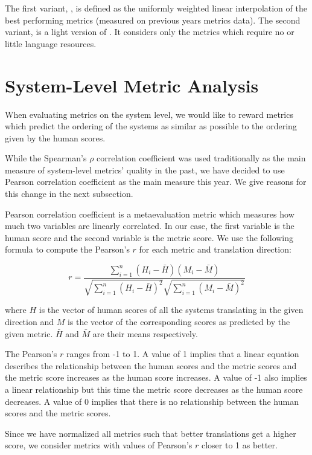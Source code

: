 The first variant, , is defined as the uniformly weighted
linear interpolation of the best performing metrics (measured on previous years
metrics data). The second variant,  is a light version of
.  It considers only the metrics which require no or little
language resources.


\section{System-Level Metric Analysis}
\label{system-level}

When evaluating metrics on the system level, we would like to reward metrics
which predict the ordering of the systems as similar as possible to the
ordering given by the human scores.

While the Spearman's $\rho$ correlation coefficient was used traditionally as
the main measure of system-level metrics' quality in the past, we have decided
to use Pearson correlation coefficient as the main measure this year. We give
reasons for this change in the next subsection.

Pearson correlation coefficient is a metaevaluation metric which measures how
much two variables are linearly correlated.  In our case, the first variable is
the human score and the second variable is the metric score. We use the
following formula to compute the Pearson's $r$ for each metric and translation
direction:

\begin{equation}
    r = \frac{\sum ^n _{i=1}(H_i - \bar{H})(M_i - \bar{M})}{\sqrt{\sum ^n _{i=1}(H_i - \bar{H})^2} \sqrt{\sum ^n _{i=1}(M_i - \bar{M})^2}} 
\end{equation}

\noindent where $H$ is the vector of human scores of all the systems translating in
the given direction and $M$ is the vector of the corresponding scores as predicted
by the given metric. $\bar{H}$ and $\bar{M}$ are their means respectively.

The Pearson's $r$ ranges from -1 to 1. A value of 1 implies that a linear
equation describes the relationship between the human scores and the metric
scores and the metric score increases as the human score increases. A value of
-1 also implies a linear relationship but this time the metric score decreases
as the human score decreases. A value of 0 implies that there is no
relationship between the human scores and the metric scores.

Since we have normalized all metrics such that better translations get a higher
score, we consider metrics with values of Pearson's $r$ closer to 1 as better. 

